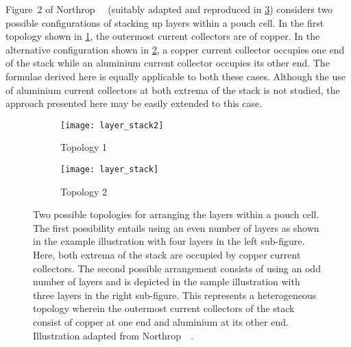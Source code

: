 Figure~2 of Northrop~\etal~\cite{Northrop2011}  (suitably adapted and reproduced
in \cref{fig:topologies})  considers two possible configurations  of stacking up
layers within a pouch cell. In the first topology shown in \cref{fig:topology1},
the outermost current collectors are of copper. In the alternative configuration
shown in  \cref{fig:topology2}, a copper  current collector occupies one  end of
the  stack while  an aluminium  current collector  occupies its  other end.  The
formulae derived  here is equally applicable  to both these cases.  Although the
use of aluminium current collectors at both extrema of the stack is not studied,
the approach presented here may be easily extended to this case.

\begin{figure}[!htbp]
    \centering
    \begin{subfigure}[b]{0.725\textwidth}
        \texttt{[image: layer\_stack2]}
        \caption{Topology 1}
        \label{fig:topology1}
    \end{subfigure}
    \hfill
    \begin{subfigure}[b]{0.225\textwidth}
        \texttt{[image: layer\_stack]}
        \caption{Topology 2}
        \label{fig:topology2}
    \end{subfigure}
    \caption[Two possile topologies for arranging the layers within a pouch
    cell]
    {Two possible topologies for arranging the layers within a pouch cell. The
        first possibility entails using an even number of layers as shown in the
        example illustration with four layers in the left sub-figure. Here, both
        extrema of the stack are occupied by copper current collectors. The
        second possible arrangement consists of using an odd number of layers
        and  is depicted in the  sample illustration with three layers in
        the right sub-figure. This represents a heterogeneous topology wherein
        the outermost current collectors of the stack consist of copper at one
        end and aluminium at its other end. Illustration adapted from
    Northrop~\etal~\cite{Northrop2011}.}
    \label{fig:topologies}
\end{figure}

